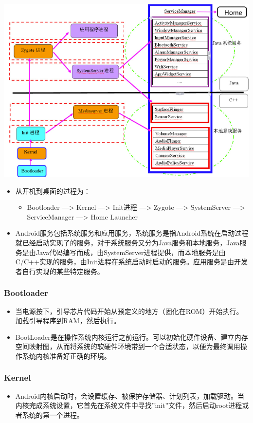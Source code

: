 \documentclass[9pt, b5paper]{article}
\begin{document}
\includegraphics[width=.9\linewidth]{./pic/androidStart.png}
\begin{itemize}
\item 从开机到桌面的过程为：
\begin{itemize}
\item Bootloader ---> Kernel ---> Init进程 ---> Zygote ---> SystemServer ---> ServiceManager ---> Home Launcher
\end{itemize}
\item Android服务包括系统服务和应用服务，系统服务是指Android系统在启动过程就已经启动实现了的服务，对于系统服务又分为Java服务和本地服务，Java服务是由Java代码编写而成，由SystemServer进程提供，而本地服务是由C/C++实现的服务，由Init进程在系统启动时启动的服务。应用服务是由开发者自行实现的某些特定服务。
\end{itemize}
\subsubsection{Bootloader}
\label{sec-5-0-1}
\begin{itemize}
\item 当电源按下，引导芯片代码开始从预定义的地方（固化在ROM）开始执行。加载引导程序到RAM，然后执行。
\item BootLoader是在操作系统内核运行之前运行。可以初始化硬件设备、建立内存空间映射图，从而将系统的软硬件环境带到一个合适状态，以便为最终调用操作系统内核准备好正确的环境。
\end{itemize}
\subsubsection{Kernel}
\label{sec-5-0-2}
\begin{itemize}
\item Android内核启动时，会设置缓存、被保护存储器、计划列表，加载驱动。当内核完成系统设置，它首先在系统文件中寻找”init”文件，然后启动root进程或者系统的第一个进程。
\end{itemize}
\end{document}
